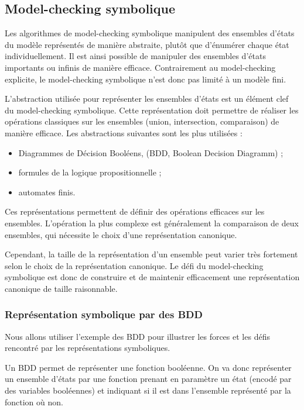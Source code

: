 \subsection{Model-checking symbolique}

Les algorithmes de model-checking symbolique manipulent des ensembles d'états
du modèle représentés de manière abstraite, plutôt que d'énumérer chaque état
individuellement. Il est ainsi possible de manipuler des ensembles
d'états importants ou infinis de manière efficace. Contrairement au
model-checking explicite, le model-checking symbolique n'est donc pas limité à
un modèle fini.

L'abstraction utilisée pour représenter les ensembles d'états est un élément
clef du model-checking symbolique. Cette représentation doit permettre de
réaliser les opérations classiques sur les ensembles (union, intersection,
comparaison) de manière efficace. Les abstractions suivantes sont les plus
utilisées :

\begin{itemize}
\item
  Diagrammes de Décision Booléens, (BDD, Boolean Decision Diagramm) ;
\item
  formules de la logique propositionnelle ;
\item
  automates finis.
\end{itemize}

Ces représentations permettent de définir des opérations efficaces sur les
ensembles. L'opération la plus complexe est généralement la comparaison de deux
ensembles, qui nécessite le choix d'une représentation canonique.

Cependant, la taille de la représentation d'un ensemble peut varier très
fortement selon le choix de la représentation canonique. Le défi du
model-checking symbolique est donc de construire et de maintenir efficacement
une représentation canonique de taille raisonnable.

\subsubsection{Représentation symbolique par des BDD}

Nous allons utiliser l'exemple des BDD pour illustrer les forces et les
défis rencontré par les représentations symboliques.

Un BDD permet de représenter une fonction booléenne.
On va donc représenter un ensemble d'états par une fonction prenant
en paramètre un état (encodé par des variables booléennes) et indiquant si
il est dans l'ensemble représenté par la fonction où non.

